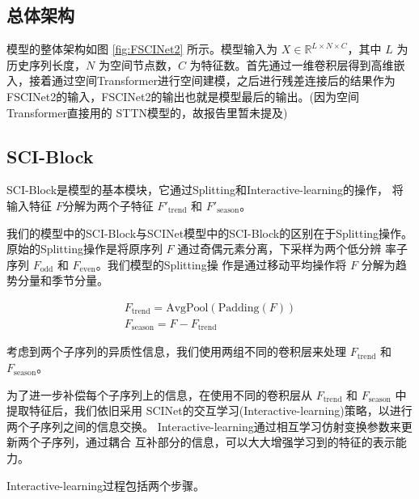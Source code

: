\documentclass[twoside,a4paper]{article}
\begin{document}
\begin{CJK*}{UTF8}{gkai}
\subsection{总体架构}
模型的整体架构如图 \ref{fig:FSCINet2} 所示。模型输入为 $X\in \mathbb
R^{L\times N\times C}$，其中 $L$ 为历史序列长度，$N$ 为空间节点数，$C$
为特征数。首先通过一维卷积层得到高维嵌入，接着通过空间Transformer进行空间建模，之后进行残差连接后的结果作为
FSCINet2的输入，FSCINet2的输出也就是模型最后的输出。(因为空间
Transformer直接用的 STTN模型的，故报告里暂未提及)

\subsection{SCI-Block}

SCI-Block是模型的基本模块，它通过Splitting和Interactive-learning的操作，
将输入特征 $F$分解为两个子特征 $F'_{\text{trend}}$ 和
$F'_{\text{season}}$。

我们的模型中的SCI-Block与SCINet模型中的SCI-Block的区别在于Splitting操作。
原始的Splitting操作是将原序列 $F$ 通过奇偶元素分离，下采样为两个低分辨
率子序列 $F_{\text{odd}}$ 和 $F_{\text{even}}$。我们模型的Splitting操
作是通过移动平均操作将 $F$ 分解为趋势分量和季节分量。

\begin{gather}
  F_{\text{trend}}=\text{AvgPool}(\text{Padding}(F))\\
  F_{\text{season}}=F-F_{\text{trend}}
\end{gather}

考虑到两个子序列的异质性信息，我们使用两组不同的卷积层来处理
$F_{\text{trend}}$ 和 $F_{\text{season}}$。


为了进一步补偿每个子序列上的信息，在使用不同的卷积层从
$F_{\text{trend}}$ 和 $F_{\text{season}}$ 中提取特征后，我们依旧采用
SCINet的交互学习(Interactive-learning)策略，以进行两个子序列之间的信息交换。
Interactive-learning通过相互学习仿射变换参数来更新两个子序列，通过耦合
互补部分的信息，可以大大增强学习到的特征的表示能力。


Interactive-learning过程包括两个步骤。


\end{CJK*}
\end{document}
